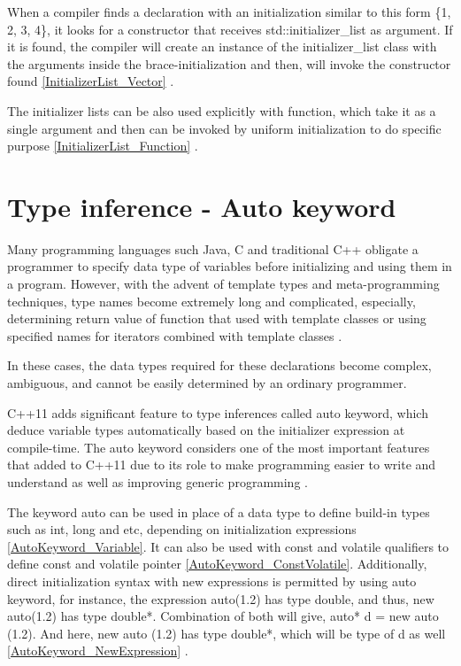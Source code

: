\documentclass[11pt]{report}
\begin{document}
When a compiler finds a declaration with an initialization similar to this form \{1, 2, 3, 4\}, it looks for a constructor that receives std::initializer\_list as argument. If it is found, the compiler will create an instance of the initializer\_list class with the arguments inside the brace-initialization and then, will invoke the constructor found \ref{InitializerList_Vector} \cite{Reddy:2011:API}. 


The initializer lists can be also used explicitly with function, which take it as a single argument and then can be invoked by uniform initialization to do specific purpose \ref{InitializerList_Function} \cite{Reddy:2011:API}.


\section{Type inference - Auto keyword}
\label{section: Auto keyword}
Many programming languages such Java, C and traditional C++ obligate a programmer to specify data type of variables before initializing and using them in a program. However, with the advent of template types and meta-programming techniques, type names become extremely long and complicated, especially, determining return value of function that used with template classes or using specified names for iterators combined with template classes \cite{Horstmann:2008:BC}.


In these cases, the data types required for these declarations become complex, ambiguous, and cannot be easily determined by an ordinary programmer.


C++11 adds significant feature to type inferences called auto keyword, which deduce variable types automatically based on the initializer expression at compile-time.  The auto keyword considers one of the most important features that added to C++11 due to its role to make programming easier to write and understand as well as improving generic programming \cite{Gregorie:professionalcpp}.


The keyword auto can be used in place of a data type to define build-in types such as int, long and etc, depending on initialization expressions \ref{AutoKeyword_Variable}. It can also be used with const and volatile qualifiers to define const and volatile pointer \ref{AutoKeyword_ConstVolatile}. Additionally, direct initialization syntax with new expressions is permitted by using auto keyword, for instance, the expression auto(1.2) has type double, and thus, new auto(1.2) has type double*. Combination of both will give, auto* d = new auto (1.2). And here, new auto (1.2) has type double*, which will be type of d as well \ref{AutoKeyword_NewExpression} \cite{Stroustrup:2012:Cpp11}.
\end{document}
